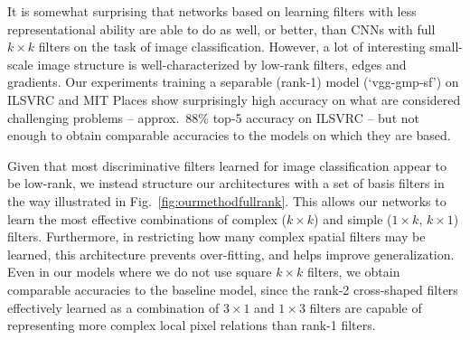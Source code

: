 \documentclass[thesis]{subfiles}
\begin{document}
    It is somewhat surprising that networks based on learning filters with less representational ability are able to do as well, or better, than CNNs with full $k\times k$ filters on the task of image classification. However, a lot of interesting small-scale image structure is well-characterized by low-rank filters, \eg edges and gradients. Our experiments training a separable (rank-1) model (`vgg-gmp-sf') on ILSVRC and MIT Places show surprisingly high accuracy on what are considered challenging problems -- approx.\ 88\% top-5 accuracy on ILSVRC -- but not enough to obtain comparable accuracies to the models on which they are based.
    
    Given that most discriminative filters learned for image classification appear to be low-rank, we instead structure our architectures with a set of basis filters in the way illustrated in Fig.~\ref{fig:ourmethodfullrank}. This allows our networks to learn the most effective combinations of complex (\eg $k\times k$) and simple (\eg $1\times k$, $k\times 1$) filters. Furthermore, in restricting how many complex spatial filters may be learned, this architecture prevents over-fitting, and helps improve generalization. Even in our models where we do not use square $k\times k$ filters, we obtain comparable accuracies to the baseline model, since the rank-2 cross-shaped filters effectively learned as a combination of $3 \times 1$ and $1 \times 3$ filters are capable of representing more complex local pixel relations than rank-1 filters.
    
    
    
    
\end{document}
